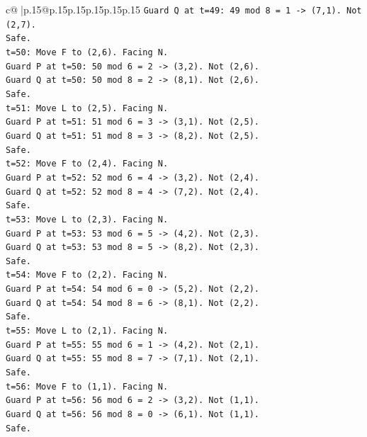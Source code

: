 \documentclass{article}
\begin{document}
{\begin{supertabular}{c@{$\;$}|p{.15\linewidth}@{}p{.15\linewidth}p{.15\linewidth}p{.15\linewidth}p{.15\linewidth}p{.15\linewidth}}
{{{\texttt{Guard Q at t=49: 49 mod 8 = 1 {-}> (7,1). Not (2,7).} \\
\texttt{Safe.} \\
\texttt{t=50: Move F to (2,6). Facing N.} \\
\texttt{Guard P at t=50: 50 mod 6 = 2 {-}> (3,2). Not (2,6).} \\
\texttt{Guard Q at t=50: 50 mod 8 = 2 {-}> (8,1). Not (2,6).} \\
\texttt{Safe.} \\
\texttt{t=51: Move L to (2,5). Facing N.} \\
\texttt{Guard P at t=51: 51 mod 6 = 3 {-}> (3,1). Not (2,5).} \\
\texttt{Guard Q at t=51: 51 mod 8 = 3 {-}> (8,2). Not (2,5).} \\
\texttt{Safe.} \\
\texttt{t=52: Move F to (2,4). Facing N.} \\
\texttt{Guard P at t=52: 52 mod 6 = 4 {-}> (3,2). Not (2,4).} \\
\texttt{Guard Q at t=52: 52 mod 8 = 4 {-}> (7,2). Not (2,4).} \\
\texttt{Safe.} \\
\texttt{t=53: Move L to (2,3). Facing N.} \\
\texttt{Guard P at t=53: 53 mod 6 = 5 {-}> (4,2). Not (2,3).} \\
\texttt{Guard Q at t=53: 53 mod 8 = 5 {-}> (8,2). Not (2,3).} \\
\texttt{Safe.} \\
\texttt{t=54: Move F to (2,2). Facing N.} \\
\texttt{Guard P at t=54: 54 mod 6 = 0 {-}> (5,2). Not (2,2).} \\
\texttt{Guard Q at t=54: 54 mod 8 = 6 {-}> (8,1). Not (2,2).} \\
\texttt{Safe.} \\
\texttt{t=55: Move L to (2,1). Facing N.} \\
\texttt{Guard P at t=55: 55 mod 6 = 1 {-}> (4,2). Not (2,1).} \\
\texttt{Guard Q at t=55: 55 mod 8 = 7 {-}> (7,1). Not (2,1).} \\
\texttt{Safe.} \\
\texttt{t=56: Move F to (1,1). Facing N.} \\
\texttt{Guard P at t=56: 56 mod 6 = 2 {-}> (3,2). Not (1,1).} \\
\texttt{Guard Q at t=56: 56 mod 8 = 0 {-}> (6,1). Not (1,1).} \\
\texttt{Safe.} \\
}}}
\end{supertabular}}
\end{document}
